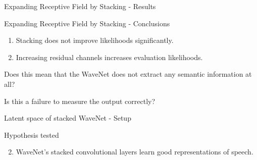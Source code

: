 \documentclass[
  ignorenonframetext,
  aspectratio=169,
]{beamer}
\providecommand{\tightlist}{%
  \setlength{\itemsep}{0pt}\setlength{\parskip}{0pt}}
\begin{document}
\begin{frame}{Expanding Receptive Field by Stacking - Results}
\protect\hypertarget{expanding-receptive-field-by-stacking---results}{}
\begin{figure}
\centering
{}\end{figure}
\end{frame}

\begin{frame}{Expanding Receptive Field by Stacking - Conclusions}
\protect\hypertarget{expanding-receptive-field-by-stacking---conclusions}{}
\begin{enumerate}
\tightlist
\item
  Stacking does not improve likelihoods significantly.
\item
  Increasing residual channels increases evaluation likelihoods.
\end{enumerate}

Does this mean that the WaveNet does not extract any semantic
information at all?

Is this a failure to measure the output correctly?
\end{frame}

\begin{frame}{Latent space of stacked WaveNet - Setup}
\protect\hypertarget{latent-space-of-stacked-wavenet---setup}{}
\begin{block}{Hypothesis tested}
\protect\hypertarget{hypothesis-tested-1}{}
\begin{enumerate}[<+->]
\setcounter{enumi}{1}
\tightlist
\item
  WaveNet's stacked convolutional layers learn good representations of
  speech.
\end{enumerate}
\end{block}
\end{frame}
\end{document}
